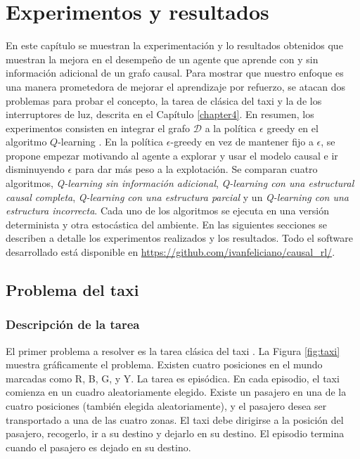 \chapter{\color{blue}Experimentos y resultados}\label{chapter5}

\graphicspath{{Chapter5/Figs/}}


En este capítulo se muestran la experimentación y lo resultados obtenidos
que muestran la mejora en el desempeño de un agente que aprende
con y sin información adicional de un grafo causal.
Para mostrar que nuestro enfoque es una manera prometedora 
de mejorar el aprendizaje por refuerzo, se atacan dos problemas para
probar el concepto, la tarea de clásica del taxi \cite{Dietterich:2000:HRL:1622262.1622268} y la de los
interruptores de luz, descrita en el Capítulo \ref{chapter4}.
En resumen, los experimentos consisten en integrar el grafo $\mathcal{D}$ a la política $\epsilon$ greedy
en el algoritmo $Q$-learning \cite{watkins1992q}.
En la política $\epsilon$-greedy en vez de mantener fijo a $\epsilon$, se propone empezar motivando al agente a explorar y usar
el modelo causal e ir disminuyendo $\epsilon$ para dar más peso a la explotación.
Se comparan cuatro algoritmos, \textit{Q-learning sin información
adicional}, \textit{Q-learning con una estructural causal completa}, \textit{Q-learning con una estructura parcial} y un \textit{Q-learning con una estructura incorrecta}.
Cada uno de los algoritmos se ejecuta en una versión determinista y 
otra estocástica del ambiente. 
En las siguientes secciones se describen a detalle los experimentos realizados y los resultados. Todo el software desarrollado está 
disponible en \url{https://github.com/ivanfeliciano/causal_rl/}.


\section{Problema del taxi}

\subsection{Descripción de la tarea}

El primer problema a resolver es la tarea clásica del taxi \cite{Dietterich:2000:HRL:1622262.1622268}.
La Figura \ref{fig:taxi} muestra gráficamente el problema.
Existen cuatro posiciones en el mundo marcadas como R, B, G, y Y. 
La tarea es episódica. En cada episodio, 
el taxi comienza en un cuadro aleatoriamente elegido. 
Existe un pasajero en una de la cuatro posiciones (también elegida
aleatoriamente), y el pasajero desea ser transportado a una de las
cuatro zonas.
El taxi debe dirigirse a la posición del pasajero, recogerlo, ir a su destino y dejarlo en su destino.
El episodio termina cuando el pasajero es dejado en su destino.

